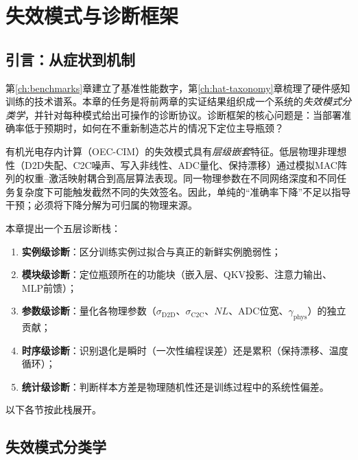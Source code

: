 
\chapter{失效模式与诊断框架}
\label{ch:failure_modes}

\section{引言：从症状到机制}

第\ref{ch:benchmarks}章建立了基准性能数字，第\ref{ch:hat-taxonomy}章梳理了硬件感知训练的技术谱系。本章的任务是将前两章的实证结果组织成一个系统的\emph{失效模式分类学}，并针对每种模式给出可操作的诊断协议。诊断框架的核心问题是：当部署准确率低于预期时，如何在不重新制造芯片的情况下定位主导瓶颈？

有机光电存内计算（OEC-CIM）的失效模式具有\emph{层级嵌套}特征。低层物理非理想性（D2D失配、C2C噪声、写入非线性、ADC量化、保持漂移）通过模拟MAC阵列的权重--激活映射耦合到高层算法表现。同一物理参数在不同网络深度和不同任务复杂度下可能触发截然不同的失效签名。因此，单纯的“准确率下降”不足以指导干预；必须将下降分解为可归属的物理来源。

本章提出一个五层诊断栈：
\begin{enumerate}
    \item \textbf{实例级诊断}：区分训练实例过拟合与真正的新鲜实例脆弱性；
    \item \textbf{模块级诊断}：定位瓶颈所在的功能块（嵌入层、QKV投影、注意力输出、MLP前馈）；
    \item \textbf{参数级诊断}：量化各物理参数（$\sigma_{\mathrm{D2D}}$、$\sigma_{\mathrm{C2C}}$、$NL$、ADC位宽、$\gamma_{\mathrm{phys}}$）的独立贡献；
    \item \textbf{时序级诊断}：识别退化是瞬时（一次性编程误差）还是累积（保持漂移、温度循环）；
    \item \textbf{统计级诊断}：判断样本方差是物理随机性还是训练过程中的系统性偏差。
\end{enumerate}

以下各节按此栈展开。


\section{失效模式分类学}
\label{sec:failure_taxonomy}

